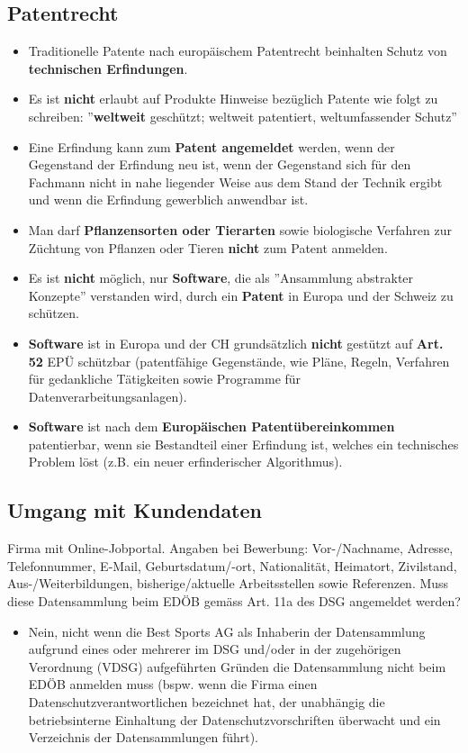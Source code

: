 \subsection{Patentrecht}
\begin{itemize}
	\item Traditionelle Patente nach europäischem Patentrecht beinhalten Schutz von \textbf{technischen Erfindungen}.
	\item Es ist \textbf{nicht} erlaubt auf Produkte Hinweise bezüglich Patente wie folgt zu schreiben: ''\textbf{weltweit} geschützt; weltweit patentiert, weltumfassender Schutz''
	\item Eine Erfindung kann zum \textbf{Patent angemeldet} werden, wenn der Gegenstand der Erfindung neu ist, wenn der Gegenstand sich für den Fachmann nicht in nahe liegender Weise aus dem Stand der Technik ergibt und wenn die Erfindung gewerblich anwendbar ist.
	\item Man darf \textbf{Pflanzensorten oder Tierarten} sowie biologische Verfahren zur Züchtung von Pflanzen oder Tieren \textbf{nicht} zum Patent anmelden.
	\item Es ist \textbf{nicht} möglich, nur \textbf{Software}, die als ''Ansammlung abstrakter Konzepte'' verstanden wird, durch ein \textbf{Patent} in Europa und der Schweiz zu schützen.
	\item \textbf{Software} ist in Europa und der CH grundsätzlich \textbf{nicht} gestützt auf \textbf{Art. 52} EPÜ schützbar (patentfähige Gegenstände, wie Pläne, Regeln, Verfahren für gedankliche Tätigkeiten sowie Programme für Datenverarbeitungsanlagen).
	\item \textbf{Software} ist nach dem \textbf{Europäischen Patentübereinkommen} patentierbar, wenn sie Bestandteil einer Erfindung ist, welches ein technisches Problem löst (z.B. ein neuer erfinderischer Algorithmus).
\end{itemize}

\subsection{Umgang mit Kundendaten}
Firma mit Online-Jobportal. Angaben bei Bewerbung: Vor-/Nachname, Adresse, Telefonnummer, E-Mail, Geburtsdatum/-ort, Nationalität, Heimatort, Zivilstand, Aus-/Weiterbildungen, bisherige/aktuelle Arbeitsstellen sowie Referenzen. Muss diese Datensammlung beim EDÖB gemäss Art. 11a des DSG angemeldet werden?
\begin{itemize}
	\item Nein, nicht wenn die Best Sports AG als Inhaberin der Datensammlung aufgrund eines oder mehrerer im DSG und/oder in der zugehörigen Verordnung (VDSG) aufgeführten Gründen die Datensammlung nicht beim EDÖB anmelden muss (bspw. wenn die Firma einen Datenschutzverantwortlichen bezeichnet hat, der unabhängig die betriebsinterne Einhaltung der Datenschutzvorschriften überwacht und ein Verzeichnis der Datensammlungen führt).
\end{itemize}

